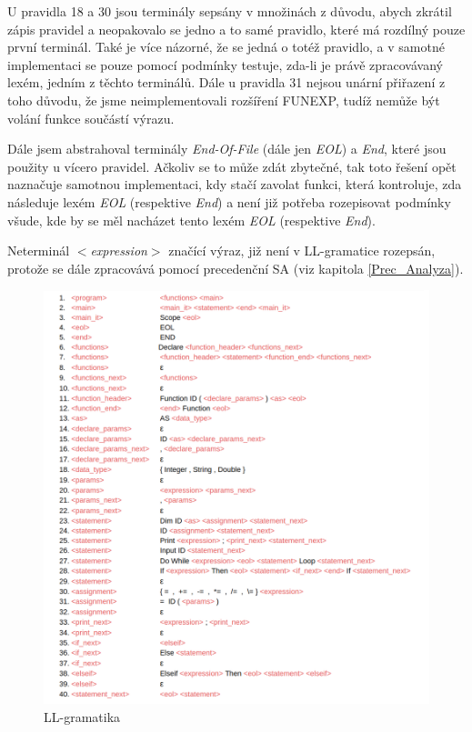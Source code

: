 \documentclass[11pt,a4paper]{article}
\begin{document}
        U pravidla 18 a 30 jsou terminály sepsány v množinách z důvodu, abych zkrátil zápis pravidel a neopakovalo se jedno a to samé pravidlo, které má rozdílný pouze první terminál. Také je více názorné, že se jedná o totéž pravidlo, a v samotné implementaci se pouze pomocí podmínky testuje, zda-li je právě zpracovávaný lexém, jedním z těchto terminálů. Dále u pravidla 31 nejsou unární přiřazení z toho důvodu, že jsme neimplementovali rozšíření FUNEXP, tudíž nemůže být volání funkce součástí výrazu.

        Dále jsem abstrahoval terminály \emph{End-Of-File} (dále jen \emph{EOL}) a \emph{End}, které jsou použity u vícero pravidel. Ačkoliv se to může zdát zbytečné, tak toto řešení opět naznačuje samotnou implementaci, kdy stačí zavolat funkci, která kontroluje, zda následuje lexém \emph{EOL} (respektive \emph{End}) a není již potřeba rozepisovat podmínky všude, kde by se měl nacházet tento lexém \emph{EOL} (respektive \emph{End}).

        Neterminál \emph{$<$expression$>$} značící výraz, již není v LL-gramatice rozepsán, protože se dále zpracovává pomocí precedenční SA (viz kapitola \ref{Prec_Analyza}).

        \newpage

            \begin{figure}[h!]
                \centering
                \includegraphics[width=17cm]{LLGram.png}
                \caption{LL-gramatika}
                \label{obr:LLG}
            \end{figure}
\end{document}
